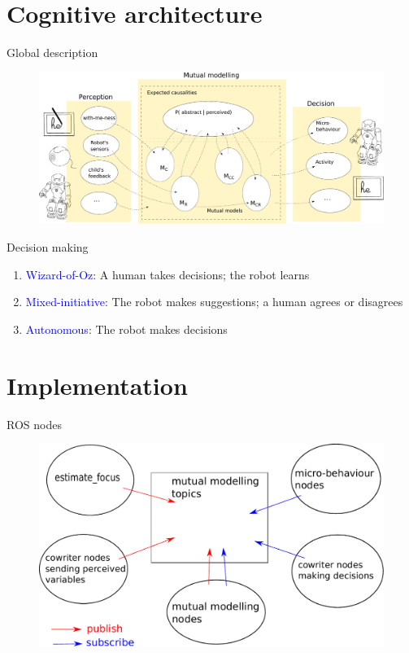 \documentclass[compress]{beamer}
\begin{document}
\section{Cognitive architecture}

\begin{frame}{Global description}
	\begin{figure}
        \centering
        \includegraphics[width=1\columnwidth]{cognitive_archi}
    \end{figure}
\end{frame}

\begin{frame}{Decision making}
\begin{enumerate}
\item \textcolor{blue}{Wizard-of-Oz}: A human takes decisions; the robot learns
\item \textcolor{blue}{Mixed-initiative}: The robot makes suggestions; a human agrees or disagrees
\item \textcolor{blue}{Autonomous}: The robot makes decisions
\end{enumerate}
\end{frame}

\section{Implementation}

\begin{frame}{ROS nodes}
	\begin{figure}
        \centering
        \includegraphics[width=0.8\columnwidth]{ros}
    \end{figure}
\end{frame}
\end{document}
